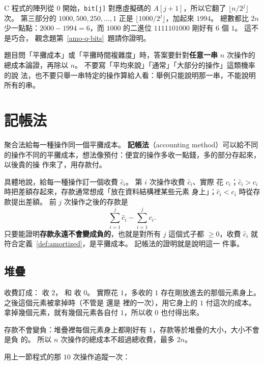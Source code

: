 C 程式的陣列從 $0$ 開始，\texttt{bit[j]} 對應虛擬碼的 $A[j + 1]$，所以它翻了
$\lfloor n / 2^j \rfloor$ 次。 第三部分的 $1000, 500, 250, \ldots, 1$ 正是
$\lfloor 1000 / 2^j \rfloor$，加起來 $1994$。 總數都比 $2n$ 少一點點：$2000 - 1994
= 6$，而 $1000$ 的二進位 $1111101000$ 剛好有 $6$ 個 $1$。 這不是巧合，
觀念題第~\ref{amo-q-bits}~題請你證明。

\begin{examnote}
題目問「平攤成本」或「平攤時間複雜度」時，答案要針對\textbf{任意一串} $n$ 次操作的
總成本論證，再除以 $n$。 不要寫「平均來說」「通常」「大部分的操作」這類機率的說
法，也不要只舉一串特定的操作算給人看：舉例只能說明那一串，不能說明所有的串。
\end{examnote}

\section{記帳法}
\label{sec:amo-accounting}

聚合法給每一種操作同一個平攤成本。 \textbf{記帳法}（accounting method）可以給不同
的操作不同的平攤成本，想法像預付：便宜的操作多收一點錢，多的部分存起來，以後貴的操
作來了，用存款付。

具體地說，給每一種操作訂一個收費 $\hat{c}_i$。 第 $i$ 次操作收費 $\hat{c}_i$、實際
花 $c_i$；$\hat{c}_i > c_i$ 時把差額存起來，存款通常想成「放在資料結構裡某些元素
身上」；$\hat{c}_i < c_i$ 時從存款提出差額。 前 $j$ 次操作之後的存款是
\[
\sum_{i=1}^{j} \hat{c}_i - \sum_{i=1}^{j} c_i.
\]
只要能證明\textbf{存款永遠不會變成負的}，也就是對所有 $j$ 這個式子都 $\ge 0$，收費
$\hat{c}_i$ 就符合定義~\ref{def:amortized}，是平攤成本。 記帳法的證明就是說明這一
件事。

\subsection{堆疊}

收費訂成： 收 $2$， 和  收 $0$。 
實際花 $1$，多收的 $1$ 存在剛放進去的那個元素身上。 之後這個元素被拿掉時（不管是
 還是  裡的一次），用它身上的 $1$ 付這次的成本。
 拿掉幾個元素，就有幾個元素各自付 $1$，所以收 $0$ 也付得出來。

存款不會變負：堆疊裡每個元素身上都剛好有 $1$，存款等於堆疊的大小，大小不會是負
的。 所以 $n$ 次操作的總成本不超過總收費，最多 $2n$。

用上一節程式的那 $10$ 次操作追蹤一次：

